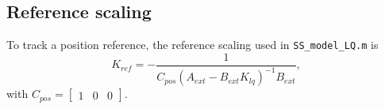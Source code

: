 \subsection{Reference scaling}

To track a position reference, the reference scaling used in \texttt{SS\_model\_LQ.m} is
\begin{equation}
    K_{ref} = -\frac{1}{C_{pos}\left(A_{ext} - B_{ext} K_{lq}\right)^{-1} B_{ext}},
\end{equation}
with $C_{pos} = \begin{bmatrix} 1 & 0 & 0 \end{bmatrix}$.
